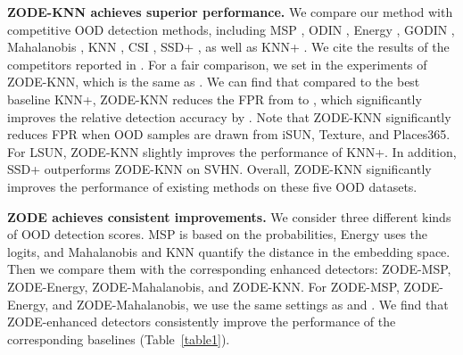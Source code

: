 \documentclass{article} \usepackage{iclr2023_conference,times}
\begin{document}
{\bf ZODE-KNN achieves superior performance.} We compare our method with competitive OOD detection methods, including MSP \citep{hendrycks17baseline}, ODIN \citep{liang2018enhancing}, Energy \citep{liu2020energy}, GODIN \citep{hsu2020generalized}, Mahalanobis \citep{lee2018simple}, KNN \citep{sun2022knn}, CSI \citep{tack2020csi}, SSD+ \citep{sehwag2021ssd}, as well as KNN+ \citep{sun2022knn}. 
We cite the results of the competitors reported in \cite{sun2022knn}. 
For a fair comparison, we set  in the experiments of ZODE-KNN, which is the same as \cite{sun2022knn}. 
We can find that compared to the best baseline KNN+, ZODE-KNN reduces the FPR from  to , which significantly improves the relative detection accuracy by . Note that ZODE-KNN significantly reduces FPR when OOD samples are drawn from iSUN, Texture, and Places365. For LSUN, ZODE-KNN slightly improves the performance of KNN+.
In addition, SSD+ outperforms ZODE-KNN on SVHN. 
Overall, ZODE-KNN significantly improves the performance of existing methods on these five OOD datasets.


{\bf ZODE achieves consistent improvements.} We consider three different kinds of OOD detection scores. MSP \citep{hendrycks17baseline} is based on the probabilities, Energy \citep{liu2020energy} uses the logits, and Mahalanobis \citep{lee2018simple} and KNN \citep{sun2022knn} quantify the distance in the embedding space.
Then we compare them with the corresponding enhanced detectors: ZODE-MSP, ZODE-Energy, ZODE-Mahalanobis, and ZODE-KNN.
For ZODE-MSP, ZODE-Energy, and ZODE-Mahalanobis, we use the same settings as \cite{hendrycks17baseline} and \cite{liu2020energy}.
We find that ZODE-enhanced detectors consistently improve the performance of the corresponding baselines (Table~\ref{table1}).
\end{document}
